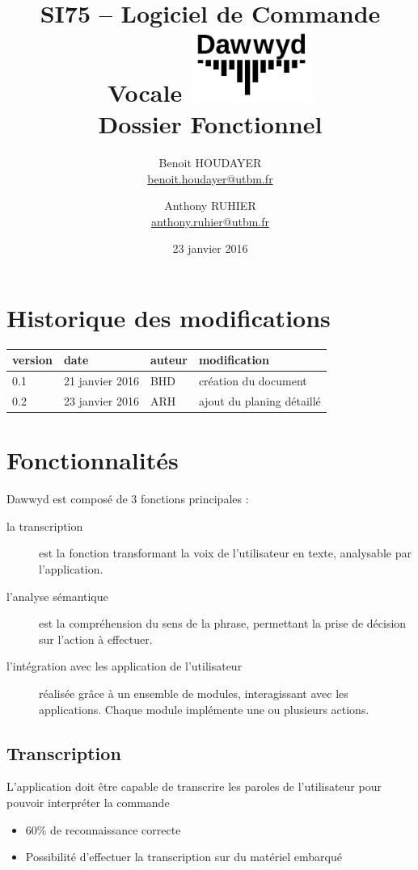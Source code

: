 \documentclass[12pt]{article}
\title{\vspace{-1cm}\textbf{%
    SI75 -- Logiciel de Commande Vocale \vspace{0.5cm}
    \protect\includegraphics[width=4cm]{logo.jpg}\\[0.5em]
    Dossier Fonctionnel}}
\author{Benoit HOUDAYER \\ \href{mailto:benoit.houdayer@utbm.fr}{benoit.houdayer@utbm.fr}
\and Anthony RUHIER \\ \href{mailto:anthony.ruhier@utbm.fr}{anthony.ruhier@utbm.fr}}
\date{23 janvier 2016}
\begin{document}
    \maketitle
    \thispagestyle{empty}
    \tableofcontents
    \listoffigures

    \section*{Historique des modifications}

    \begin{table}[H]
    \centering

    \begin{tabular}{|l|l|l|l|}
        \hline
        version & date & auteur & modification \\
        \hline
        0.1 & 21 janvier 2016 & BHD & création du document \\
        0.2 & 23 janvier 2016 & ARH & ajout du planing détaillé \\
        \hline
    \end{tabular}
    \end{table}

    \afterpage{\cfoot{\thepage}}
    \newpage

    \section{Fonctionnalités}
    Dawwyd est composé de 3 fonctions principales :
    \begin{description}
        \item[la transcription] est la fonction transformant la voix
            de l'utilisateur en texte, analysable par l'application.
        \item[l'analyse sémantique] est la compréhension du sens de la phrase,
            permettant la prise de décision sur l'action à effectuer.
        \item[l'intégration avec les application de l'utilisateur] réalisée
            grâce à un ensemble de modules, interagissant avec les applications.
            Chaque module implémente une ou plusieurs actions.
    \end{description}

    \subsection{Transcription}
    L'application doit être capable de transcrire
    les paroles de l'utilisateur pour pouvoir interpréter la
    commande
    \begin{itemize}
        \item 60\% de reconnaissance correcte
        \item Possibilité d'effectuer la transcription sur du matériel embarqué
    \end{itemize}
\end{document}
